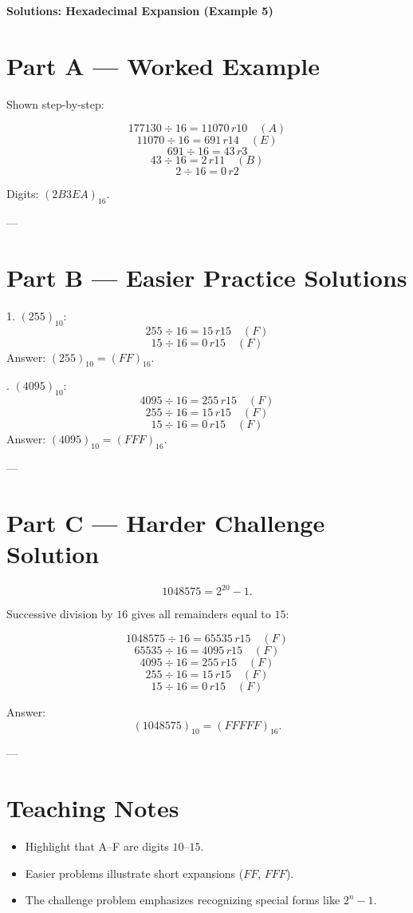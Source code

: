 \documentclass[12pt]{article}
\begin{document}
\begin{center}
\Large\textbf{Solutions: Hexadecimal Expansion (Example 5)}
\end{center}

\section*{Part A — Worked Example}
Shown step-by-step:

\[
177130 \div 16 = 11070 \, r10 \quad (A)
\]
\[
11070 \div 16 = 691 \, r14 \quad (E)
\]
\[
691 \div 16 = 43 \, r3
\]
\[
43 \div 16 = 2 \, r11 \quad (B)
\]
\[
2 \div 16 = 0 \, r2
\]

Digits: $(2B3EA)_{16}$.

---

\section*{Part B — Easier Practice Solutions}

1. $(255)_{10}$:
\[
255 \div 16 = 15 \, r15 \quad (F)
\]
\[
15 \div 16 = 0 \, r15 \quad (F)
\]
Answer: $(255)_{10} = (FF)_{16}$.

. $(4095)_{10}$:
\[
4095 \div 16 = 255 \, r15 \quad (F)
\]
\[
255 \div 16 = 15 \, r15 \quad (F)
\]
\[
15 \div 16 = 0 \, r15 \quad (F)
\]
Answer: $(4095)_{10} = (FFF)_{16}$.

---

\section*{Part C — Harder Challenge Solution}

\[
1048575 = 2^{20} - 1.
\]

Successive division by $16$ gives all remainders equal to $15$:

\[
1048575 \div 16 = 65535 \, r15 \quad (F)
\]
\[
65535 \div 16 = 4095 \, r15 \quad (F)
\]
\[
4095 \div 16 = 255 \, r15 \quad (F)
\]
\[
255 \div 16 = 15 \, r15 \quad (F)
\]
\[
15 \div 16 = 0 \, r15 \quad (F)
\]

Answer:
\[
(1048575)_{10} = (FFFFF)_{16}.
\]

---

\section*{Teaching Notes}
\begin{itemize}
  \item Highlight that A–F are digits $10$–$15$.
  \item Easier problems illustrate short expansions ($FF$, $FFF$).
  \item The challenge problem emphasizes recognizing special forms like $2^n - 1$.
\end{itemize}
\end{document}
